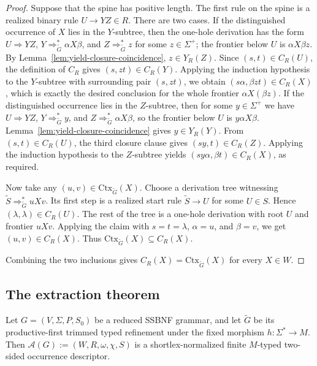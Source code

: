 \documentclass[sub]{jalc}
\newcommand{\Gtrim}{\widetilde G}
\begin{document}
\begin{proof}
Suppose that the spine has positive length. The first rule on the spine is a realized binary rule \(U\to YZ\in R\). There are two cases. If the distinguished occurrence of \(X\) lies in the \(Y\)-subtree, then the one-hole derivation has the form \(U\Rightarrow YZ\), \(Y\Rightarrow_{\Gtrim}^*\alpha X\beta\), and \(Z\Rightarrow_{\Gtrim}^* z\) for some \(z\in\Sigma^+\); the frontier below \(U\) is \(\alpha X\beta z\). By Lemma~\ref{lem:yield-closure-coincidence}, \(z\in Y_R(Z)\). Since \((s,t)\in C_R(U)\), the definition of \(C_R\) gives \((s,zt)\in C_R(Y)\). Applying the induction hypothesis to the \(Y\)-subtree with surrounding pair \((s,zt)\), we obtain \((s\alpha,\beta zt)\in C_R(X)\), which is exactly the desired conclusion for the whole frontier \(\alpha X(\beta z)\). If the distinguished occurrence lies in the \(Z\)-subtree, then for some \(y\in\Sigma^+\) we have \(U\Rightarrow YZ\), \(Y\Rightarrow_{\Gtrim}^*y\), and \(Z\Rightarrow_{\Gtrim}^*\alpha X\beta\), so the frontier below \(U\) is \(y\alpha X\beta\). Lemma~\ref{lem:yield-closure-coincidence} gives \(y\in Y_R(Y)\). From \((s,t)\in C_R(U)\), the third closure clause gives \((sy,t)\in C_R(Z)\). Applying the induction hypothesis to the \(Z\)-subtree yields \((sy\alpha,\beta t)\in C_R(X)\), as required.

Now take any \((u,v)\in\mathrm{Ctx}_{\Gtrim}(X)\). Choose a derivation tree witnessing \(\widetilde S\Rightarrow_{\Gtrim}^*uXv\). Its first step is a realized start rule \(\widetilde S\to U\) for some \(U\in S\). Hence \((\lambda,\lambda)\in C_R(U)\). The rest of the tree is a one-hole derivation with root \(U\) and frontier \(uXv\). Applying the claim with \(s=t=\lambda\), \(\alpha=u\), and \(\beta=v\), we get \((u,v)\in C_R(X)\). Thus \(\mathrm{Ctx}_{\Gtrim}(X)\subseteq C_R(X)\).

Combining the two inclusions gives \(C_R(X)=\mathrm{Ctx}_{\Gtrim}(X)\) for every \(X\in W\).
\end{proof}

\subsection{The extraction theorem}
\label{subsec:extraction-theorem}

\begin{theorem}
\label{thm:extraction}
Let \(G=(V,\Sigma,P,S_0)\) be a reduced SSBNF grammar, and let \(\Gtrim\) be its productive-first trimmed typed refinement under the fixed morphism \(h:\Sigma^*\to M\). Then \(\mathcal A(G):=(W,R,\omega,\chi,S)\) is a shortlex-normalized finite \(M\)-typed two-sided occurrence descriptor.
\end{theorem}
\end{document}

